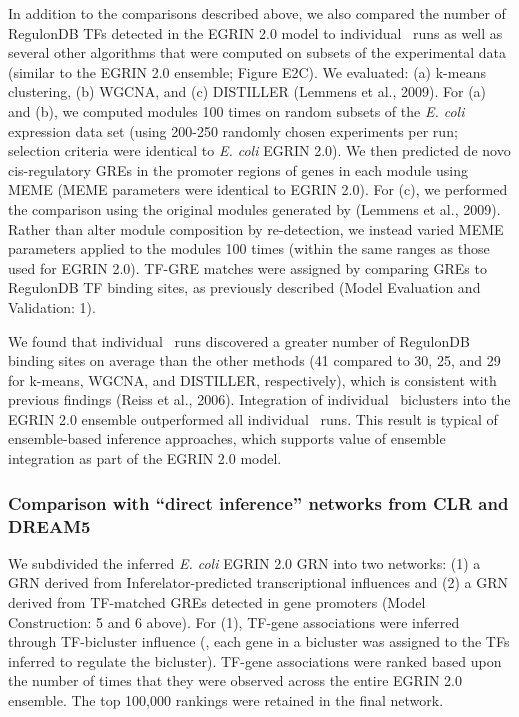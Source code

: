 In addition to the comparisons described above, we also compared the
number of RegulonDB TFs detected in the EGRIN 2.0 model to individual
\cm\ runs as well as several other algorithms that were computed on
subsets of the experimental data (similar to the EGRIN 2.0 ensemble;
Figure E2C). We evaluated: (a) k-means clustering, (b) WGCNA, and (c)
DISTILLER (Lemmens et al., 2009). For (a) and (b), we computed modules
100 times on random subsets of the {\it E. coli} expression data set (using
200-250 randomly chosen experiments per run; selection criteria were
identical to {\it E. coli} EGRIN 2.0). We then predicted de novo
cis-regulatory GREs in the promoter regions of genes in each module
using MEME (MEME parameters were identical to EGRIN 2.0). For (c), we
performed the comparison using the original modules generated by
(Lemmens et al., 2009). Rather than alter module composition by
re-detection, we instead varied MEME parameters applied to the modules
100 times (within the same ranges as those used for EGRIN 2.0). TF-GRE
matches were assigned by comparing GREs to RegulonDB TF binding sites,
as previously described (Model Evaluation and Validation: 1).

We found that individual \cm\ runs discovered a greater number of
RegulonDB binding sites on average than the other methods (41 compared
to 30, 25, and 29 for k-means, WGCNA, and DISTILLER, respectively),
which is consistent with previous findings (Reiss et al.,
2006). Integration of individual \cm\ biclusters into the EGRIN 2.0
ensemble outperformed all individual \cm\ runs. This result is
typical of ensemble-based inference approaches, which supports value
of ensemble integration as part of the EGRIN 2.0 model.

\subsubsection{Comparison with ``direct inference'' networks from CLR and DREAM5}

We subdivided the inferred {\it E. coli} EGRIN 2.0 GRN into two networks:
(1) a GRN derived from Inferelator-predicted transcriptional
influences and (2) a GRN derived from TF-matched GREs detected in gene
promoters (Model Construction: 5 and 6 above). For (1), TF-gene
associations were inferred through TF-bicluster influence (\ie, each
gene in a bicluster was assigned to the TFs inferred to regulate the
bicluster). TF-gene associations were ranked based upon the number of
times that they were observed across the entire EGRIN 2.0
ensemble. The top 100,000 rankings were retained in the final network.

